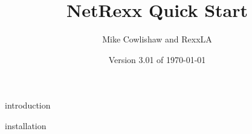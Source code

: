 
        
\setcounter{tocdepth}{1} 
\title{NetRexx Quick Start}
\author{Mike Cowlishaw and RexxLA}
\date{Version 3.01 of \today}
\maketitle
{}
\pagestyle{plain}
\frontmatter
{}
\pagestyle{plain}

\tableofcontents
\newpage
{}
\frontmatter
\large


 {introduction}
\mainmatter

 {installation}




%
%


\backmatter
\listoffigures
\listoftables
\lstlistoflistings
\printindex
\clearpage
 
